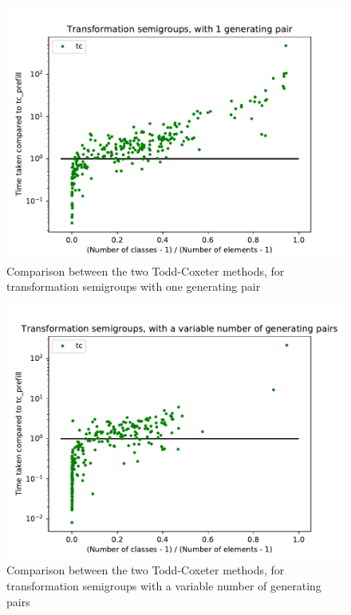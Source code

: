 \begin{figure}[h]
  \centering
  \includegraphics[width=\textwidth]{pics/ch-pairs/bench-trans-tc-1p-tccomp}
  \caption{Comparison between the two Todd-Coxeter methods, for transformation
    semigroups with one generating pair}
  \label{fig:bench-trans-tc-1p-tccomp}
\end{figure}

\begin{figure}[h]
  \centering
  \includegraphics[width=\textwidth]{pics/ch-pairs/bench-trans-tc-vp-tccomp}
  \caption{Comparison between the two Todd-Coxeter methods, for transformation
    semigroups with a variable number of generating pairs}
  \label{fig:bench-trans-tc-vp-tccomp}
\end{figure}


